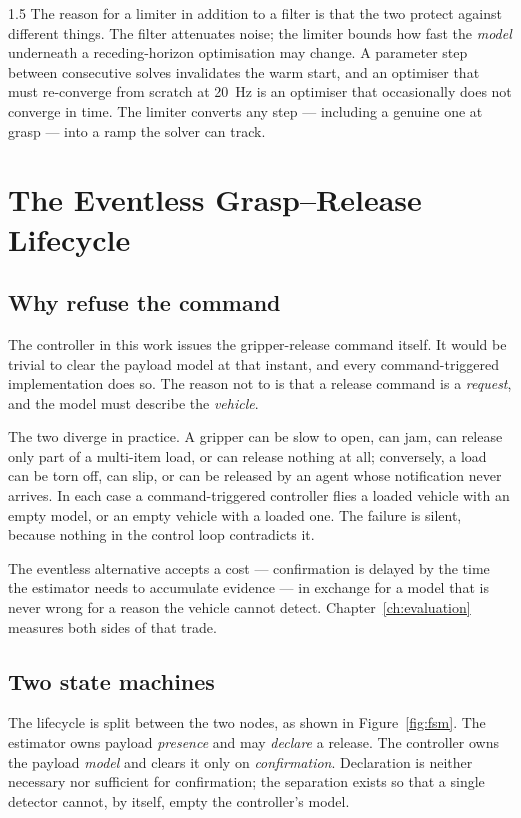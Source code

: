\begin{spacing}{1.5}
The reason for a limiter in addition to a filter is that the two protect against
different things. The filter attenuates noise; the limiter bounds how fast the
\emph{model} underneath a receding-horizon optimisation may change. A parameter
step between consecutive solves invalidates the warm start, and an optimiser that
must re-converge from scratch at \SI{20}{\hertz} is an optimiser that
occasionally does not converge in time. The limiter converts any step ---
including a genuine one at grasp --- into a ramp the solver can track.

\section{The Eventless Grasp--Release Lifecycle}\label{sec:frame:lifecycle}

\subsection{Why refuse the command}\label{sec:frame:why-eventless}

The controller in this work issues the gripper-release command itself. It would
be trivial to clear the payload model at that instant, and every command-triggered
implementation does so. The reason not to is that a release command is a
\emph{request}, and the model must describe the \emph{vehicle}.

The two diverge in practice. A gripper can be slow to open, can jam, can release
only part of a multi-item load, or can release nothing at all; conversely, a load
can be torn off, can slip, or can be released by an agent whose notification
never arrives. In each case a command-triggered controller flies a loaded vehicle
with an empty model, or an empty vehicle with a loaded one. The failure is silent,
because nothing in the control loop contradicts it.

The eventless alternative accepts a cost --- confirmation is delayed by the time
the estimator needs to accumulate evidence --- in exchange for a model that is
never wrong for a reason the vehicle cannot detect.
Chapter~\ref{ch:evaluation} measures both sides of that trade.

\subsection{Two state machines}\label{sec:frame:fsm}

The lifecycle is split between the two nodes, as shown in
Figure~\ref{fig:fsm}. The estimator owns payload \emph{presence} and may
\emph{declare} a release. The controller owns the payload \emph{model} and clears
it only on \emph{confirmation}. Declaration is neither necessary nor sufficient
for confirmation; the separation exists so that a single detector cannot, by
itself, empty the controller's model.


\end{spacing}
